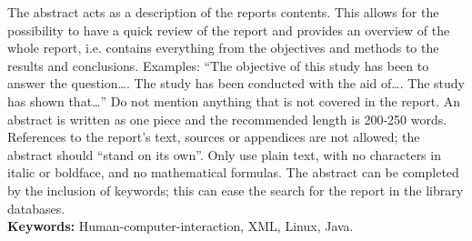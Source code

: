 The abstract acts as a description of the reports contents. This allows for
the possibility to have a quick review of the report and provides an
overview of the whole report, i.e. contains everything from the
objectives and methods to the results and conclusions. Examples: “The
objective of this study has been to answer the question…. The study has
been conducted with the aid of…. The study has shown that…” Do not
mention anything that is not covered in the report. An abstract is written
as one piece and the recommended length is 200-250 words. References
to the report's text, sources or appendices are not allowed; the abstract
should “stand on its own”. Only use plain text, with no characters in
italic or boldface, and no mathematical formulas. The abstract can be
completed by the inclusion of keywords; this can ease the search for the
report in the library databases.\\
\newline
\textbf{Keywords:} Human-computer-interaction, XML, Linux, Java. 